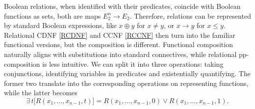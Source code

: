 \documentclass[11pt]{article}
\theoremstyle{plain}
\theoremstyle{definition}
\begin{document}
Boolean relations, when identified with their predicates, coincide with Boolean functions as sets, both are maps $E_2^n\to E_2$. Therefore, relations can be represented by standard Boolean expressions, like $x\oplus y$ for $x\neq y$, or $x\to y$ for $x\leq y$. Relational CDNF \eqref{RCDNF} and CCNF \eqref{RCCNF} then turn into the familiar functional versions, but the composition is different. Functional composition naturally aligns with substitutions into standard connectives, while relational pp-composition is less intuitive. We can split it into three operations: taking conjunctions, identifying variables in predicates and existentially quantifying. The former two translate into the corresponding operations on representing functions, while the latter becomes
\begin{equation}\label{E2Fun}
\exists\,t\big[R(x_1,\dots,x_{n-1},t)\big]=R(x_1,\dots,x_{n-1},0)\lor R(x_1,\dots,x_{n-1},1).
\end{equation}
\end{document}
